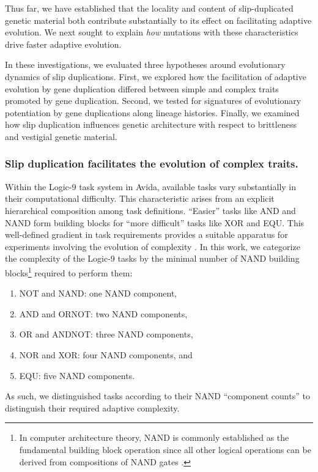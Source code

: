 Thus far, we have established that the locality and content of slip-duplicated genetic material both contribute substantially to its effect on facilitating adaptive evolution.
We next sought to explain \textit{how} mutations with these characteristics drive faster adaptive evolution.

In these investigations, we evaluated three hypotheses around evolutionary dynamics of slip duplications.
First, we explored how the facilitation of adaptive evolution by gene duplication differed between simple and complex traits promoted by gene duplication.
Second, we tested for signatures of evolutionary potentiation by gene duplications along lineage histories.
Finally, we examined how slip duplication influences genetic architecture with respect to brittleness and vestigial genetic material.

\subsubsection{Slip duplication facilitates the evolution of complex traits.}

Within the Logic-9 task system in Avida, available tasks vary substantially in their computational difficulty.
This characteristic arises from an explicit hierarchical composition among task definitions.
``Easier'' tasks like AND and NAND form building blocks for ``more difficult'' tasks like XOR and EQU.
This well-defined gradient in task requirements provides a suitable apparatus for experiments involving the evolution of complexity \citep{lenski2003evolutionary}.
In this work, we categorize the complexity of the Logic-9 tasks by the minimal number of NAND building blocks\footnote{
In computer architecture theory, NAND is commonly established as the fundamental building block operation since all other logical operations can be derived from compositions of NAND gates \citep{mano1997logic}.
} required to perform them:
\begin{enumerate}
\item NOT and NAND: one NAND component,
\item AND and ORNOT: two NAND components,
\item OR and ANDNOT: three NAND components,
\item NOR and XOR: four NAND components, and
\item EQU: five NAND components.
\end{enumerate}
As such, we distinguished tasks according to their NAND ``component counts'' to distinguish their required adaptive complexity.

